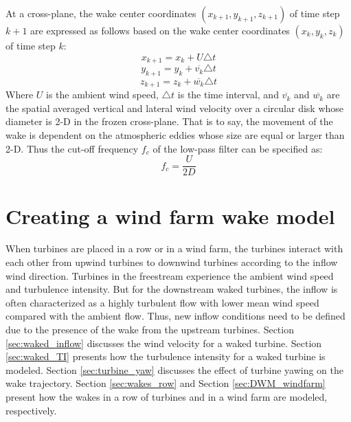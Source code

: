 \documentclass{umthesis}
\begin{document}
At a cross-plane, the wake center coordinates $(x_{k+1},y_{k+1},z_{k+1})$ of time step $k+1$ are expressed as follows based on the wake center coordinates $(x_{k},y_{k},z_{k})$ of time step $k$:
\begin{equation}
  x_{k+1}=x_k+U\triangle t
\end{equation}
\begin{equation}
  y_{k+1}=y_k+\overline{v_k}\triangle t
\end{equation}
\begin{equation}
  z_{k+1}=z_k+\overline{w_k}\triangle t
\end{equation}
Where $U$ is the ambient wind speed, $\triangle t$ is the time interval, and $\overline{v_k}$ and $\overline{w_k}$ are the spatial averaged vertical and lateral wind velocity over a circular disk whose diameter is 2-D in the frozen cross-plane. That is to say, the movement of the wake is dependent on the atmospheric eddies whose size are equal or larger than 2-D. Thus the cut-off frequency $f_c$ of the low-pass filter can be specified as:
\begin{equation}
  f_c=\frac{U}{2D}
\end{equation}



\chapter{Creating a wind farm wake model}
When turbines are placed in a row or in a wind farm, the turbines interact with each other from upwind turbines to downwind turbines according to the inflow wind direction. Turbines in the freestream experience the ambient wind speed and turbulence intensity. But for the downstream waked turbines, the inflow is often characterized as a highly turbulent flow with lower mean wind speed compared with the ambient flow. Thus, new inflow conditions need to be defined due to the presence of the wake from the upstream turbines. Section \ref{sec:waked_inflow} discusses the wind velocity for a waked turbine. Section \ref{sec:waked_TI} presents how the turbulence intensity for a waked turbine is modeled. Section \ref{sec:turbine_yaw} discusses the effect of turbine yawing on the wake trajectory. Section \ref{sec:wakes_row} and Section \ref{sec:DWM_windfarm} present how the wakes in a row of turbines and in a wind farm are modeled, respectively.
\end{document}
